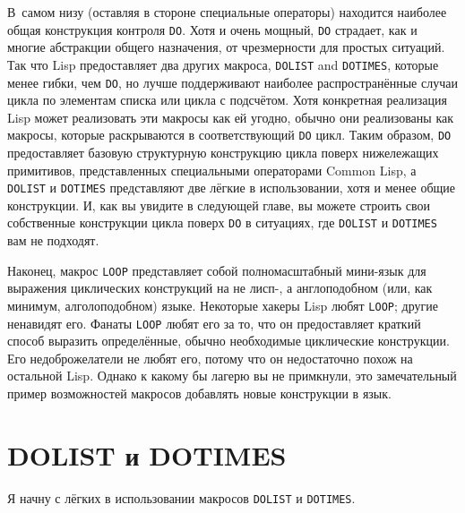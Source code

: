 В~самом низу (оставляя в стороне специальные операторы) находится наиболее общая
конструкция контроля \lstinline{DO}. Хотя и очень мощный, \lstinline{DO} страдает, как и многие
абстракции общего назначения, от чрезмерности для простых ситуаций. Так что Lisp
предоставляет два других макроса, \lstinline{DOLIST} and \lstinline{DOTIMES}, которые менее гибки,
чем \lstinline{DO}, но лучше поддерживают наиболее распространённые случаи цикла по элементам
списка или цикла с подсчётом. Хотя конкретная реализация Lisp может реализовать эти
макросы как ей угодно, обычно они реализованы как макросы, которые раскрываются в
соответствующий \lstinline{DO} цикл. Таким образом, \lstinline{DO} предоставляет базовую структурную
конструкцию цикла поверх нижележащих примитивов, представленных специальными операторами
Common Lisp, а \lstinline{DOLIST} и \lstinline{DOTIMES} представляют две лёгкие в использовании,
хотя и менее общие конструкции. И, как вы увидите в следующей главе, вы можете строить
свои собственные конструкции цикла поверх \lstinline{DO} в ситуациях, где \lstinline{DOLIST} и
\lstinline{DOTIMES} вам не подходят.

Наконец, макрос \lstinline{LOOP} представляет собой полномасштабный мини-язык для выражения
циклических конструкций на не лисп-, а англоподобном (или, как минимум, алголоподобном)
языке. Некоторые хакеры Lisp любят \lstinline{LOOP}; другие ненавидят его. Фанаты \lstinline{LOOP}
любят его за то, что он предоставляет краткий способ выразить определённые, обычно
необходимые циклические конструкции. Его недоброжелатели не любят его, потому что он
недостаточно похож на остальной Lisp. Однако к какому бы лагерю вы не примкнули, это
замечательный пример возможностей макросов добавлять новые конструкции в язык.

\section{DOLIST и DOTIMES}

Я начну с лёгких в использовании макросов \lstinline{DOLIST} и \lstinline{DOTIMES}.

